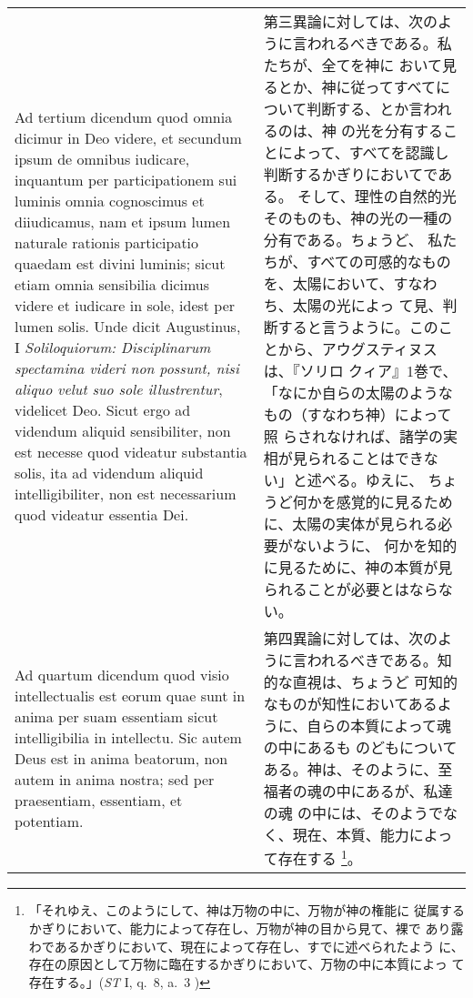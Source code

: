 \documentclass[10pt]{jsarticle} %
\begin{document}
\begin{longtable}{p{21em}p{21em}}
\\

{\sc  Ad tertium dicendum} quod omnia dicimur in Deo videre, et
 secundum ipsum de omnibus iudicare, inquantum per participationem sui
 luminis omnia cognoscimus et diiudicamus, nam et ipsum lumen naturale
 rationis participatio quaedam est divini luminis; sicut etiam omnia
 sensibilia dicimus videre et iudicare in sole, idest per lumen
 solis. Unde dicit Augustinus, I {\it Soliloquiorum: Disciplinarum spectamina
 videri non possunt, nisi aliquo velut suo sole illustrentur}, videlicet
 Deo. Sicut ergo ad videndum aliquid sensibiliter, non est necesse quod
 videatur substantia solis, ita ad videndum aliquid intelligibiliter,
 non est necessarium quod videatur essentia Dei.


&

第三異論に対しては、次のように言われるべきである。私たちが、全てを神に
おいて見るとか、神に従ってすべてについて判断する、とか言われるのは、神
の光を分有することによって、すべてを認識し判断するかぎりにおいてである。
そして、理性の自然的光そのものも、神の光の一種の分有である。ちょうど、
私たちが、すべての可感的なものを、太陽において、すなわち、太陽の光によっ
て見、判断すると言うように。このことから、アウグスティヌスは、『ソリロ
クィア』1巻で、「なにか自らの太陽のようなもの（すなわち神）によって照
らされなければ、諸学の実相が見られることはできない」と述べる。ゆえに、
ちょうど何かを感覚的に見るために、太陽の実体が見られる必要がないように、
何かを知的に見るために、神の本質が見られることが必要とはならない。

\\




{\sc  Ad quartum dicendum} quod visio intellectualis est eorum
 quae sunt in anima per suam essentiam sicut intelligibilia in
 intellectu. Sic autem Deus est in anima beatorum, non autem in anima
 nostra; sed per praesentiam, essentiam, et potentiam.


&

第四異論に対しては、次のように言われるべきである。知的な直視は、ちょうど
可知的なものが知性においてあるように、自らの本質によって魂の中にあるも
のどもについてある。神は、そのように、至福者の魂の中にあるが、私達の魂
の中には、そのようでなく、現在、本質、能力によって存在する
\footnote{「それゆえ、このようにして、神は万物の中に、万物が神の権能に
従属するかぎりにおいて、能力によって存在し、万物が神の目から見て、裸で
あり露わであるかぎりにおいて、現在によって存在し、すでに述べられたよう
に、存在の原因として万物に臨在するかぎりにおいて、万物の中に本質によっ
て存在する。」({\it ST} I, q.~8, a.~3 )}。


\end{longtable}
\end{document}
